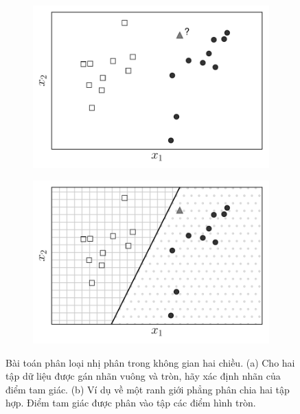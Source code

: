 \begin{figure}[t]
\begin{subfigure}{0.49\textwidth}
\includegraphics[width=0.99\linewidth]{ebookML_src/src/perceptron/pla1.pdf}
\caption{}
\label{fig:9_1a}
\end{subfigure}
\begin{subfigure}{0.49\textwidth}
\includegraphics[width=0.99\linewidth]{ebookML_src/src/perceptron/pla2.pdf}
\caption{}
\label{fig:9_1b}
\end{subfigure}
\caption{
Bài toán phân loại nhị phân trong không gian hai chiều. (a) Cho hai tập dữ liệu được gán nhãn vuông và tròn, hãy xác định nhãn của điểm tam giác. (b) Ví dụ về một ranh giới phẳng phân chia hai tập hợp. Điểm tam giác được phân vào tập các điểm hình tròn.
}
\label{fig:9_1}
\end{figure}







